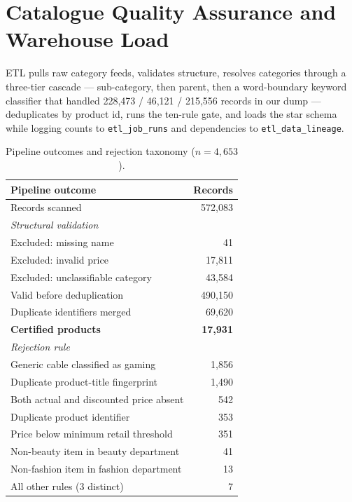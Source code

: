 \documentclass[conference]{IEEEtran}
\begin{document}
\section{Catalogue Quality Assurance and Warehouse Load}
\label{sec:etl}

ETL pulls raw category feeds, validates structure, resolves categories through a
three-tier cascade --- sub-category, then parent, then a word-boundary keyword
classifier that handled 228{,}473 / 46{,}121 / 215{,}556 records in our dump ---
deduplicates by product id, runs the ten-rule gate, and loads the star schema while
logging counts to \texttt{etl\_job\_runs} and dependencies to
\texttt{etl\_data\_lineage}.

\begin{table}[t]
\caption{Pipeline outcomes and rejection taxonomy ($n=4{,}653$).}
\label{tab:gate}
\centering
\footnotesize
\setlength{\tabcolsep}{3.6pt}
\begin{tabular}{@{}p{}r@{}}
\toprule
\textbf{Pipeline outcome} & \textbf{Records} \\
\midrule
Records scanned & 572{,}083 \\
\textit{Structural validation} & \\
\quad Excluded: missing name & 41 \\
\quad Excluded: invalid price & 17{,}811 \\
\quad Excluded: unclassifiable category & 43{,}584 \\
Valid before deduplication & 490{,}150 \\
\quad Duplicate identifiers merged & 69{,}620 \\
\textbf{Certified products} & \textbf{17{,}931} \\
\midrule
\textit{Rejection rule} & \\
\quad Generic cable classified as gaming & 1{,}856 \\
\quad Duplicate product-title fingerprint & 1{,}490 \\
\quad Both actual and discounted price absent & 542 \\
\quad Duplicate product identifier & 353 \\
\quad Price below minimum retail threshold & 351 \\
\quad Non-beauty item in beauty department & 41 \\
\quad Non-fashion item in fashion department & 13 \\
\quad All other rules (3 distinct) & 7 \\
\bottomrule
\end{tabular}
\vspace{-2pt}
\end{table}
\end{document}
